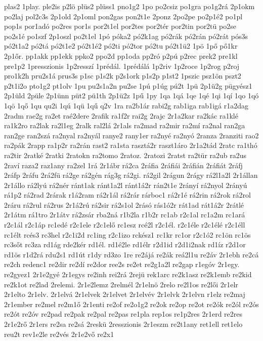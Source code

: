 {plas2
1play.
ple2is
p2lö
plüs2
plüss1
pno1g2
1po
po2csiz
po1gra
po1g2rá
2p1okm
po2laj
pol2c3s
2p1old
2p1oml
pon2gas
pon2t1e
2ponz
2po2pe
po2p1é2
po1pl
pop1s
por1adó
po2res
por1s
por2t1el
por2tes
por2tér
por2tin
por2tü
po2se
po2s1é
po1szf
2p1oszl
po2t1el
1pó
póka2
pó2k1ag
pó2rák
pó2rán
pó2rát
pós3s
pó2t1a2
pó2tá
pó2t1e2
pó2t1é2
pó2ti
pó2tor
pó2tu
pó2t1ü2
1pö
1pő
pő1kr
2p1őr.
pp1akk
pp1ekk
ppko2
ppo2d
pp1oda
pp2ró
p2pú
p2rec
prek2
pre1kl
pre1p2
1presszionis
1p2resszí
1prédál.
1prédálá
1p2riv
1p2roce
1p2rog
p2roj
pro1k2h
pru2s1á
prus3s
p1sc
p1s2k
p2s1ork
p1s2p
p1st2
1pszic
psz1ön
pszt2
p2t1i2o
pto1g2
pt1olv
1pu
pu2s1a2n
pu2se
1pú
p1úg
pú2t
1pü
2p1ü2g
pügyész1
2p1üld
2püle
2p1ünn
püt2
pü1th
2p1ü2z
1pű
1py
1qa
1qá
1qe
1qé
1qi
1qí
1qo
1qó
1qö
1qő
1qu
qu2i
1qú
1qü
1qű
q2v
1ra
ra2b1ár
rabi2g
rab1iga
rab1igá
r1a2dag
2radm
rae2g
ra2et
raé2dere
2rafik
ra1f2r
rai2g
2rajc
2r1a2kar
ra2kác
ra1klé
ra1k2ro
ra2lak
ra2l1eg
2ralk
ral2lá
2r1als
ra2mad
ra2mir
ra2mí
ra2nal
ran2ga
ran2ge
ran2szá
ra2nyal
ra2nyál
ranye2
rany1er
ra2nyé
ra2nyó
2ranza
2ranziti
rao2
ra2pák
2rapp
ra1p2r
ra2rán
rast2
ra1sta
rasztá2r
raszt1áro
2r1a2tád
2ratc
ra1thó
ra2tir
2ratké
2ratki
2ratokn
ra2tomo
2ratoz.
2ratozi
2ratst
ra2tür
ra2ub
ra2us
2raví
raza2
raz1any
ra2zel
1rá
2r1ábr
rá2ca
2ráfia
2ráfiái
2ráfián
2ráfiát
2ráfj
2ráfp
2ráfu
2rá2fü
rá2ge
rá2gén
rág3g
rá2gi.
rá2gil
2rágun
2rágy
rá2l1a2l
2r1állan
2r1állo
rá2lyú
rá2nér
ránt1ak
ránt1a2l
ránt1á2r
rán2t1e
2rányí
rá2nyol
2rányú
rá1p2
rá2rad
2rárak
r1á2ram
rá2r1ál
rá2rár
rárboc1
rá2r1é
rá2rin
rá2rok
rá2rol
2ráru
rá2rul
rá2rus
2r1á2rú
rá2sir
rá2s1ol
2rásó
rás1ó2r
rát1ad
rát1á2r
2rátlé
2r1átm
rá1tro
2r1átv
rá2zsár
rba2ná
r1b2la
r1b2r
rc1ab
r2c1al
rc1a2m
rc1ará
r2c1ál
r2c1áp
rc1edé
r2c1ele
r2c1elő
rc1esz
rcé2l
r2c1él.
r2c1éle
r2c1élé
r2c1éll
rc1élt
rcés3
rc3hel
r2c1i2d
rc1ing
r2c1izo
rckész1
rc1kr
rc1or
r2c1ó2
rc1ön
rc1ös
rc3sőt
rc3za
rd1ág
rde2kér
rd1él.
rd1é2le
rd1élr
r2d1id
r2d1i2nak
rd1íz
r2d1or
rd1ös
r1d2rá
rdu2s1
rd1út
r1dy
rd3zo
1re
re2ájá
re2ák
reá2l1u
re2áv
2r1ebh
re2cá
re2ch
redenc1
re2dir
re2dí
re2dor
ree2s
re2et
re2g1a2l
re2gap
r1egóv
2r1egy.
re2gyez1
2r1e2gyé
2r1egys
re2inh
rei2rá
2rejü
rek1arc
re2k1asz
re2k1emb
re2kid
re2k1ot
re2lad
2relemi.
2r1e2lemz
2relmél
2r1elnö
2relo
re2l1os
re2lői
2r1elr
2r1elto
2r1elv.
2r1elvá
2r1elvek
2r1elvet
2r1elvév
2r1elvk
2r1elvn
r1elz
re2maj
2r1ember
re2mel
re2m1ő
2r1enti
re2of
re2o1g2
re2ok
re2op
re2ot
re2ók
re2ól
re2ós
re2ót
re2óv
re2pad
re2pak
re2pal
re2pas
re1pla
rep1os
re1p2res
2r1erd
re2res
2r1e2rő
2r1ers
re2sa
re2sá
2reskü
2resszionis
2r1eszm
re2t1any
ret1ell
ret1elo
reu2t
rev1e2le
re2vés
2r1e2vő
re2x1
}
